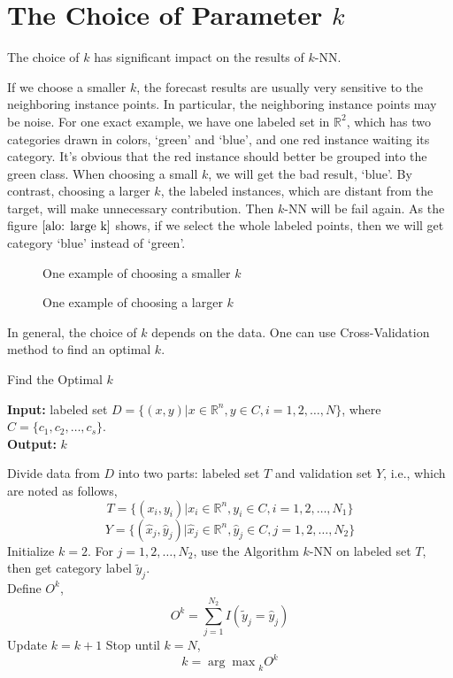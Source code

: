 	   

\section{The Choice of Parameter $k$}
    The choice of $k$ has significant impact on the results of $k$-NN.

    If we choose a smaller $k$, the forecast results are usually very sensitive to the neighboring instance points. In particular, the neighboring instance points may be noise. For one exact example, we have one labeled set in $\mathbb{R}^{2}$, which has two categories drawn in colors, `green' and `blue', and one red instance waiting its category. It's obvious that the red instance should better be grouped into the green class. When choosing a small $k$, we will get the bad result, `blue'.  By contrast, choosing a larger $k$, the labeled instances, which are distant from the target, will make unnecessary contribution. Then $k$-NN will be fail again. As the figure $\ref{alo: large k}$ shows, if we select the whole labeled points, then we will get category `blue' instead of `green'.

	\begin{figure}[htbp]
	    \caption{One example of choosing a smaller $k$}
	    \label{alo:small k}
        \end{figure}


   

       \begin{figure}[htbp]
	\caption{One example of choosing a larger $k$}
	\label{alo: large k}
       \end{figure}



    In general, the choice of $k$ depends on the data. One can use Cross-Validation method to find an optimal $k$.

    \begin{algorithm}
    	\caption{Find the Optimal $k$}
    	\label{alo:find the optimal k}
    	\textbf{Input:}  labeled set $D=\{(x, y)|x \in\mathbb{R}^n, y \in C, i=1,2,\dots, N\}$, where $C = \{c_{1}, c_{2}, \dots, c_{s}\}$.\\
    	\textbf{Output:} $k$

    	\begin{algorithmic}[1]
         \State Divide data from $D$ into two parts: labeled set $T$ and validation set $Y$, i.e., which are noted as follows,   	 $$T = \{(x_{i}, y_{i})|x_{i} \in\mathbb{R}^{n}, y_{i} \in C, i = 1, 2, \dots, N_{1}\}$$
         $$Y = \{(\hat{x}_{j}, \hat{y}_{j})|\hat{x}_{j} \in\mathbb{R}^{n}, \hat{y}_{j} \in C, j = 1, 2, \dots, N_{2}\}$$
    	 \State Initialize $k = 2$. For $j = 1, 2, \dots, N_{2}$, use the Algorithm $k$-NN on labeled set $T$, then get category label $\tilde{y}_{j}$.\\
	 Define $O^{k}$,
	 $$O^{k} = \sum_{j = 1}^{N_{2}} I(\tilde{y}_{j} = \hat{y}_{j})$$
	 Update $k = k + 1$
    	 \State Stop until $k = N$,
	 $$k = {\arg\max}_{k} O^{k}$$
    	\end{algorithmic}
    \end{algorithm}

